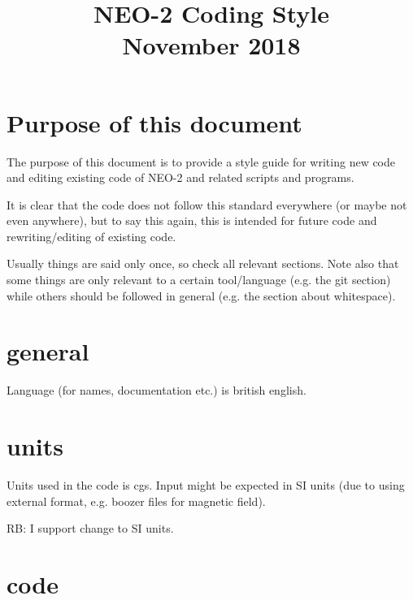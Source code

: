 \documentclass{article}
\title{\textbf{NEO-2 Coding Style\\November 2018}}
\begin{document}
\maketitle

\section{Purpose of this document}
The purpose of this document is to provide a style guide for writing new
code and editing existing code of NEO-2 and related scripts and
programs.

It is clear that the code does not follow this standard everywhere (or
maybe not even anywhere), but to say this again, this is intended for
future code and rewriting/editing of existing code.

Usually things are said only once, so check all relevant sections.
Note also that some things are only relevant to a certain tool/language
(e.g. the git section) while others should be followed in general (e.g.
the section about whitespace).

\section{general}
Language (for names, documentation etc.) is british english.

\section{units}
Units used in the code is cgs. Input might be expected in SI units (due
to using external format, e.g. boozer files for magnetic field).

RB: I support change to SI units.

\section{code}
\end{document}

